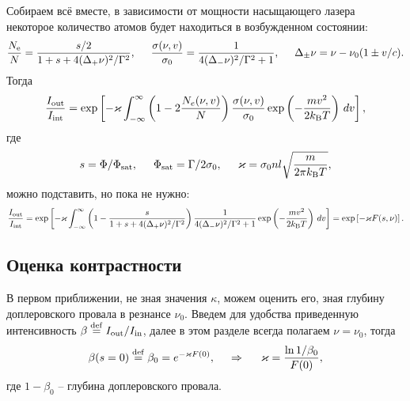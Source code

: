 Собираем всё вместе, в зависимости от мощности насыщающего лазера некоторое количество атомов будет находиться в возбужденном состоянии:
\begin{equation*}
    \frac{\ne}{N} = \frac{s/2}{1 + s + 4 (\Delta_+ \nu)^2/\Gamma^2},
    \hspace{5 mm} 
    \frac{\sigma(\nu, v) }{\sigma_0} = \frac{1}{4 (\Delta_{-}\nu)^2 / \Gamma^2 + 1},
    \hspace{5 mm} 
    \Delta_{\pm} \nu = \nu - \nu_0(1\pm  v /c).
\end{equation*}
Тогда
\begin{equation}
    \frac{\sub{I}{out}}{\sub{I}{int}} = \exp\left[
        - \kappa
        \int_{-\infty}^{\infty} 
        \left(
            1 - 2 \frac{N_e (\nu, v)}{N}
        \right)
        \frac{\sigma(\nu, v)}{\sigma_0}  \exp\left(
        - \frac{m v^2}{2 \sub{k}{B} T} 
    \right) \d v
    \right]
    , 
\end{equation}
где
\begin{equation*}
    s = \Phi/\sub{\Phi}{sat},
    \hspace{5 mm} 
    \sub{\Phi}{sat} = \Gamma/2 \sigma_0,
    \hspace{5 mm}
    \kappa = \sigma_0 n l \sqrt{\frac{m}{2 \pi \sub{k}{B} T}},
\end{equation*}
можно подставить, но пока не нужно:
\begin{equation*}
    \frac{\sub{I}{out}}{\sub{I}{int}} = \exp\left[
        - \kappa
        \int_{-\infty}^{\infty} 
        \left(
            1 - \frac{s}{1 + s + 4 (\Delta_+ \nu)^2/\Gamma^2}
        \right)
        \frac{1}{4 (\Delta_{-}\nu)^2 / \Gamma^2 + 1}  \exp\left(
        - \frac{m v^2}{2 \sub{k}{B} T} 
    \right) \d v
    \right] = \exp\left[
        - \kappa F(s, \nu)
    \right]
    .
\end{equation*}



\newpage

\subsection*{Оценка контрастности}

В первом приближении, не зная значения $\kappa$, можем оценить его, зная глубину доплеровского провала в резнансе $\nu_0$. Введем для удобства приведенную интенсивность $\beta \overset{\mathrm{def}}{=}  \sub{I}{out}/\sub{I}{in}$, далее в этом разделе всегда полагаем $\nu = \nu_0$, тогда
\begin{equation*}
    \beta(s=0) \overset{\mathrm{def}}{=}  \beta_0 = e^{- \kappa F(0)},
    \hspace{0.5cm} \Rightarrow \hspace{0.5cm}
    \kappa = \frac{\ln 1/\beta_0}{F(0)},
\end{equation*}
где $1-\beta_0$ -- глубина доплеровского провала.

